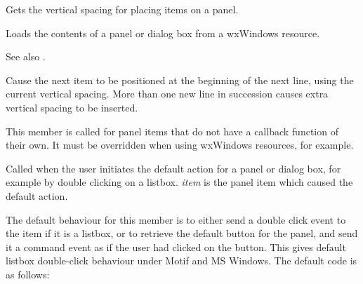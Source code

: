 
Gets the vertical spacing for placing items on a panel.

\label{wxpanelloadfromresource}


Loads the contents of a panel or dialog box from a wxWindows resource.

See also .



Cause the next item to be positioned at the beginning of the next line,
using the current vertical spacing. More than one new line in succession
causes extra vertical spacing to be inserted.

\label{wxpaneloncommand}


This member is called for panel items that do not have a callback function
of their own. It must be overridden when using wxWindows resources, for example.


\label{wxpanelondefaultaction}


Called when the user initiates the default action for a panel or
dialog box, for example by double clicking on a listbox. {\it item}
is the panel item which caused the default action.

The default behaviour for this member is to either send a double click
event to the item if it is a listbox, or to retrieve the default button
for the panel, and send it a command event as if the user had clicked
on the button. This gives default listbox double-click behaviour under
Motif and MS Windows. The default code is as follows:

